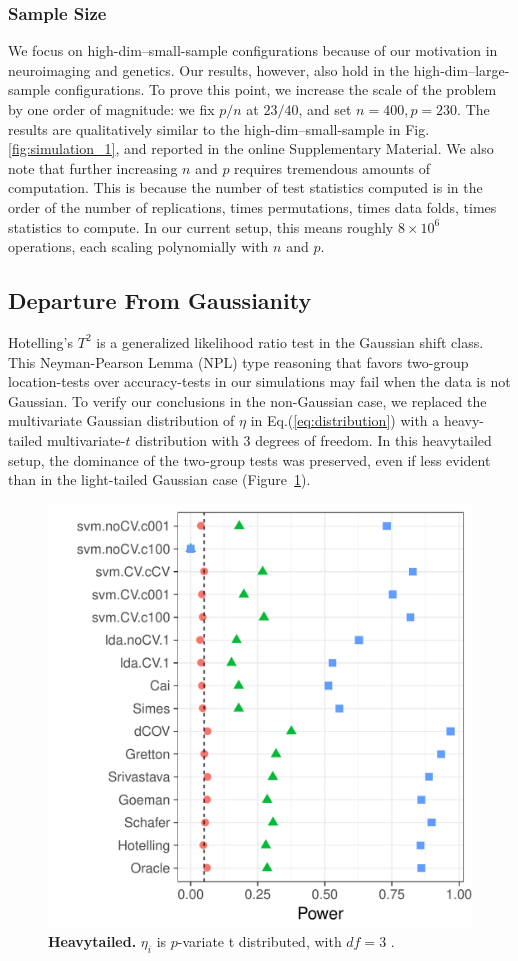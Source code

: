 \documentclass[oupdraft]{bio}
\begin{document}
\subsubsection{Sample Size}
We focus on high-dim--small-sample configurations because of our motivation in neuroimaging and genetics. 
Our results, however, also  hold in the high-dim--large-sample configurations.
To prove this point, we increase the scale of the problem by one order of magnitude: we fix $p/n$ at $23/40$, and set $n=400, p=230$. 
The results are qualitatively similar to the high-dim--small-sample in Fig.\ref{fig:simulation_1}, and reported in the online Supplementary Material.
We also note that further increasing $n$ and $p$ requires tremendous amounts of computation. 
This is because the number of test statistics computed is in the order of the number of replications, times permutations, times data folds, times statistics to compute. 
In our current setup, this means roughly $8 \times 10^6$ operations, each scaling polynomially with $n$ and $p$. 


\subsection{Departure From Gaussianity}
\label{sec:heavytailed}
Hotelling's $T^2$ is a generalized likelihood ratio test in the Gaussian shift class. 
This Neyman-Pearson Lemma (NPL) type reasoning that favors two-group location-tests over accuracy-tests in our simulations may fail when the data is not Gaussian.
To verify our conclusions in the non-Gaussian case, we replaced the multivariate Gaussian distribution of $\eta$ in Eq.(\ref{eq:distribution}) with a heavy-tailed multivariate-$t$ distribution with $3$ degrees of freedom.
In this heavytailed setup, the dominance of the two-group tests was preserved, even if less evident than in the light-tailed Gaussian case (Figure~\ref{fig:t_null}).

\begin{figure}[th]
	\centering
	\includegraphics[width=0.5\columnwidth]{"art/file9"}
	\caption{\textbf{Heavytailed.} $\eta_i$ is $p$-variate t distributed, with $df=3$ .  } 
	\label{fig:t_null}
\end{figure}
\end{document}
